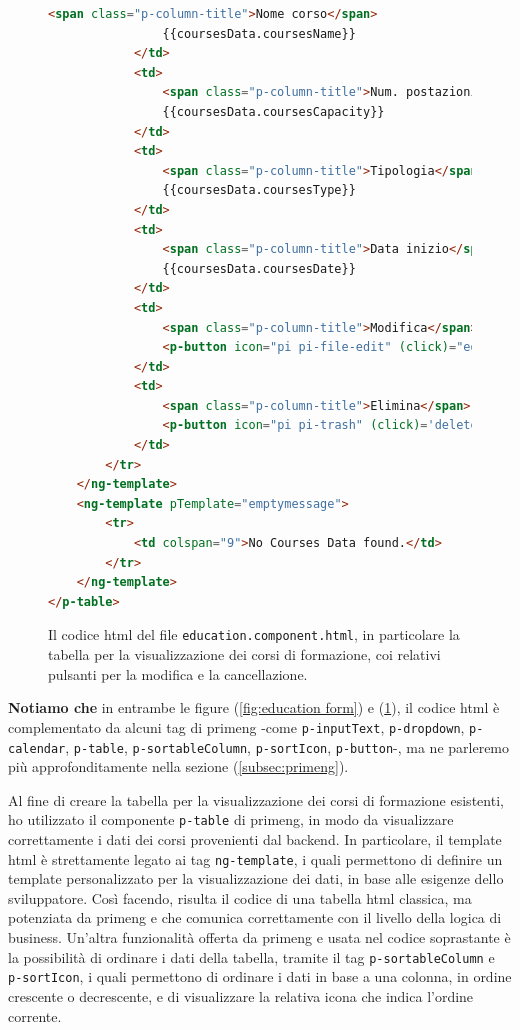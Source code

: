 \begin{figure}[H]
\begin{lstlisting}[language=HTML, linewidth=20cm, basicstyle=\tiny]
                <span class="p-column-title">Nome corso</span>
                {{coursesData.coursesName}}
            </td>
            <td>
                <span class="p-column-title">Num. postazioni max</span>
                {{coursesData.coursesCapacity}}
            </td>
            <td>
                <span class="p-column-title">Tipologia</span>
                {{coursesData.coursesType}}
            </td>
            <td>
                <span class="p-column-title">Data inizio</span>
                {{coursesData.coursesDate}}
            </td>
            <td>
                <span class="p-column-title">Modifica</span>
                <p-button icon="pi pi-file-edit" (click)="editCoursesData(coursesData); showAddForm = false;"></p-button>
            </td>
            <td>
                <span class="p-column-title">Elimina</span>
                <p-button icon="pi pi-trash" (click)='deleteCoursesData(coursesData)'></p-button>
            </td>
        </tr>
    </ng-template>
    <ng-template pTemplate="emptymessage">
        <tr>
            <td colspan="9">No Courses Data found.</td>
        </tr>
    </ng-template>
</p-table>
\end{lstlisting}
\caption{\label{fig:education table}Il codice \acrshort{html} del file \texttt{education.component.html}, in particolare la tabella per la visualizzazione dei corsi di formazione, coi relativi pulsanti per la modifica e la cancellazione.}
\end{figure}
\textbf{Notiamo che } in entrambe le figure (\ref{fig:education form}) e (\ref{fig:education table}), il codice \acrshort{html} è complementato da alcuni tag di \acrshort{primeng} -come \texttt{p-inputText}, \texttt{p-dropdown}, \texttt{p-calendar}, \texttt{p-table}, \texttt{p-sortableColumn}, \texttt{p-sortIcon}, \texttt{p-button}-, ma ne parleremo più approfonditamente nella sezione (\ref{subsec:primeng}).\newline

Al fine di creare la tabella per la visualizzazione dei corsi di formazione esistenti, ho utilizzato il componente \texttt{p-table} di \acrshort{primeng}, in modo da visualizzare correttamente i dati dei corsi provenienti dal backend. In particolare, il template \acrshort{html} è strettamente legato ai tag \texttt{ng-template}, i quali permettono di definire un template personalizzato per la visualizzazione dei dati, in base alle esigenze dello sviluppatore. Così facendo, risulta il codice di una tabella \acrshort{html} classica, ma potenziata da \acrshort{primeng} e che comunica correttamente con il livello della logica di business.
Un'altra funzionalità offerta da \acrshort{primeng} e usata nel codice soprastante è la possibilità di ordinare i dati della tabella, tramite il tag \texttt{p-sortableColumn} e \texttt{p-sortIcon}, i quali permettono di ordinare i dati in base a una colonna, in ordine crescente o decrescente, e di visualizzare la relativa icona che indica l'ordine corrente.\newline 

